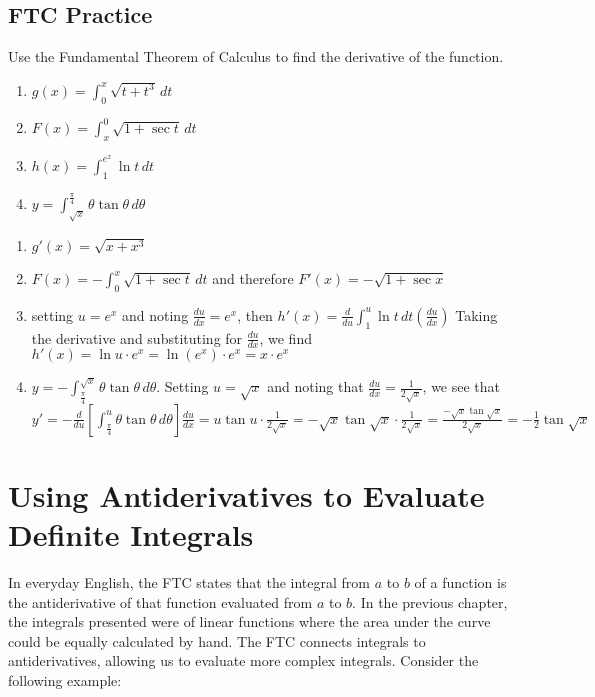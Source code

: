 \subsection{FTC Practice}
\begin{Exercise}[label=FTC1]
Use the Fundamental Theorem of Calculus to find the derivative of the 
function. 
	\begin{enumerate}
	\item $g(x) = \int_0^x \sqrt{t + t^3}\,dt$
	\item $F(x) = \int_x^0 \sqrt{1 + \sec{t}}\,dt$
	\item $h(x) = \int_1^{e^x} \ln{t}\,dt$
	\item $y = \int_{\sqrt{x}}^{\frac{\pi}{4}} \theta \tan{\theta}\,
	d\theta$
	\end{enumerate}
\end{Exercise}

\begin{Answer}[ref=FTC1]
	\begin{enumerate}
	\item $g'(x) = \sqrt{x + x^3}$
	\item $F(x) = - \int_0^x \sqrt{1+\sec{t}}\,dt$ and therefore $F'(x) = 
	- \sqrt{1+\sec{x}}$
	\item setting $u = e^x$ and noting $\frac{du}{dx} = e^x$, then $h'(x) 
	= \frac{d}{du}\int_1^{u} \ln{t}\,dt(\frac{du}{dx})$ Taking the 
	derivative and substituting for $\frac{du}{dx}$, we find $h'(x) = 
	\ln{u} \cdot e^x = \ln{(e^x)} \cdot e^x = x \cdot e^x$
	\item $y = - \int_{\frac{\pi}{4}}^{\sqrt{x}} \theta \tan{\theta}\,
	d\theta$. Setting $u = \sqrt{x}$ and noting that $\frac{du}{dx} = 
	\frac{1}{2\sqrt{x}}$, we see that $y' = -\frac{d}{du}
	[\int_{\frac{\pi}{4}}^{u}\theta\tan{\theta}\,d\theta]\frac{du}{dx} 
	= u\tan{u} \cdot \frac{1}{2\sqrt{x}} = -\sqrt{x}\tan{\sqrt{x}} \cdot 
	\frac{1}{2\sqrt{x}} = \frac{-\sqrt{x}\tan{\sqrt{x}}}{2\sqrt{x}} = 
	- \frac{1}{2}\tan{\sqrt{x}}$
	\end{enumerate}
\end{Answer}

\section{Using Antiderivatives to Evaluate Definite Integrals}
In everyday English, the FTC states that the integral from $a$ to $b$ 
of a function is the antiderivative of that function evaluated from 
$a$ to $b$. In the previous chapter, the integrals presented were of 
linear functions where the area under the curve could be equally 
calculated by hand. The FTC connects integrals to antiderivatives, 
allowing us to evaluate more complex integrals. Consider the following 
example:\\

